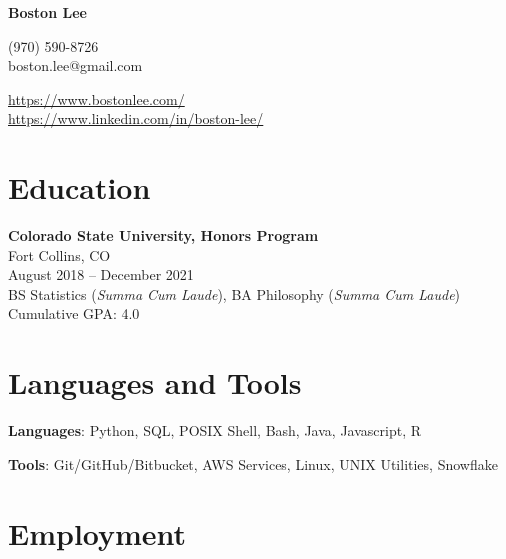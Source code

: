 \documentclass{article}
\begin{document}
\begin{flushleft}
\LARGE \textbf{Boston Lee} \\
\end{flushleft}

\noindent\begin{minipage}{0.5\textwidth}
	\begin{flushleft}
	(970) 590-8726 \\
	boston.lee@gmail.com \\
	\end{flushleft}
\end{minipage}%
\hfill
\begin{minipage}{0.5\textwidth}
	\begin{flushright}
	\url{https://www.bostonlee.com/} \\
	\url{https://www.linkedin.com/in/boston-lee/} \\
	\end{flushright}
\end{minipage}%

\section{Education}

\begin{flushleft}
\textbf{Colorado State University, Honors Program}\\
Fort Collins, CO\\
August 2018 -- December 2021\\
BS Statistics (\textit{Summa Cum Laude}), BA Philosophy (\textit{Summa Cum Laude})\\
Cumulative GPA: 4.0
\end{flushleft}

\section{Languages and Tools}

\textbf{Languages}: Python, SQL, POSIX Shell, Bash, Java, Javascript, R

\textbf{Tools}: Git/GitHub/Bitbucket, AWS Services, Linux, UNIX Utilities, Snowflake

\section{Employment}

\end{document}
